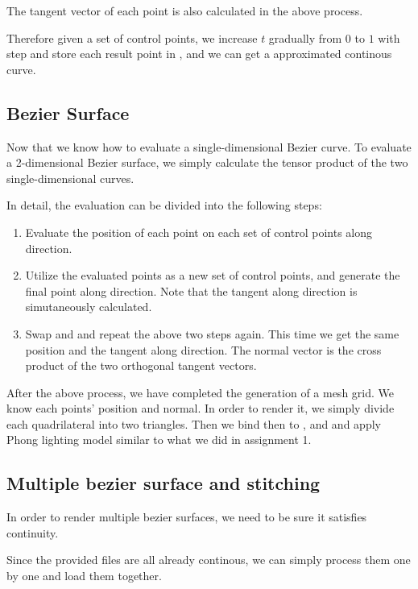 \documentclass[acmtog]{acmart}
\newcommand{\code}[1]{\texttt{\color{magenta}{#1}}} %
\begin{document}
The tangent vector of each point is also calculated in the above process. 

Therefore given a set of control points, we increase $t$ gradually from $0$ to $1$ with step \code{float DIM\_RECIPROCAL = 0.02} and store each result point in \code{std::vector<vec3>}, and we can get a approximated continous curve. 

\subsection{Bezier Surface}

Now that we know how to evaluate a single-dimensional Bezier curve. To evaluate a 2-dimensional Bezier surface, we simply calculate the tensor product of the two single-dimensional curves. 

In detail, the evaluation can be divided into the following steps:

\begin{enumerate}
	\item Evaluate the position of each point on each set of control points along \code{u} direction.
	\item Utilize the evaluated points as a new set of control points, and generate the final point along \code{v} direction. Note that the tangent along \code{v} direction is simutaneously calculated.
	\item Swap \code{u} and \code{v} and repeat the above two steps again. This time we get the same position and the tangent along \code{u} direction. The normal vector is the cross product of the two orthogonal tangent vectors.
\end{enumerate}

After the above process, we have completed the generation of a mesh grid. We know each points' position and normal. In order to render it, we simply divide each quadrilateral into two triangles. Then we bind then to \code{VAO}, \code{VBO} and \code{EBO} and apply Phong lighting model similar to what we did in assignment 1. 

\subsection{Multiple bezier surface and stitching}

In order to render multiple bezier surfaces, we need to be sure it satisfies continuity. 

Since the provided \code{.bzs} files are all already continous, we can simply process them one by one and load them together.
\end{document}
